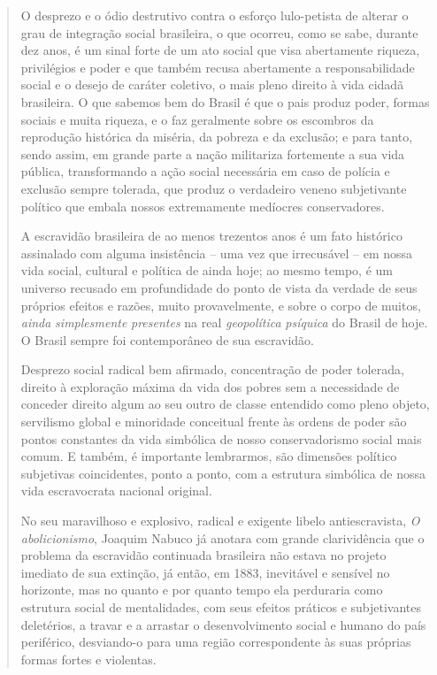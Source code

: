 \begin{quote}
O desprezo e o ódio destrutivo contra o esforço lulo-petista de alterar
o grau de integração social brasileira, o que ocorreu, como se sabe,
durante dez anos, é um sinal forte de um ato social que visa abertamente
riqueza, privilégios e poder e que também recusa abertamente a
responsabilidade social e o desejo de caráter coletivo, o mais pleno
direito à vida cidadã brasileira. O que sabemos bem do Brasil é que o
pais produz poder, formas sociais e muita riqueza, e o faz geralmente
sobre os escombros da reprodução histórica da miséria, da pobreza e da
exclusão; e para tanto, sendo assim, em grande parte a nação militariza
fortemente a sua vida pública, transformando a ação social necessária em
caso de polícia e exclusão sempre tolerada, que produz o verdadeiro
veneno subjetivante político que embala nossos extremamente medíocres
conservadores.

A escravidão brasileira de ao menos trezentos anos é um fato histórico
assinalado com alguma insistência -- uma vez que irrecusável -- em nossa
vida social, cultural e política de ainda hoje; ao mesmo tempo, é um
universo recusado em profundidade do ponto de vista da verdade de seus
próprios efeitos e razões, muito provavelmente, e sobre o corpo de
muitos, \emph{ainda} \emph{simplesmente} \emph{presentes} na real
\emph{geopolítica} \emph{psíquica} do Brasil de hoje. O Brasil sempre
foi contemporâneo de sua escravidão.

Desprezo social radical bem afirmado, concentração de poder tolerada,
direito à exploração máxima da vida dos pobres sem a necessidade de
conceder direito algum ao seu outro de classe entendido como pleno
objeto, servilismo global e minoridade conceitual frente às ordens de
poder são pontos constantes da vida simbólica de nosso conservadorismo
social mais comum. E também, é importante lembrarmos, são dimensões
político subjetivas coincidentes, ponto a ponto, com a estrutura
simbólica de nossa vida escravocrata nacional original.

No seu maravilhoso e explosivo, radical e exigente libelo
antiescravista, \emph{O abolicionismo}, Joaquim Nabuco já anotara com
grande clarividência que o problema da escravidão continuada brasileira
não estava no projeto imediato de sua extinção, já então, em 1883,
inevitável e sensível no horizonte, mas no quanto e por quanto tempo ela
perduraria como estrutura social de mentalidades, com seus efeitos
práticos e subjetivantes deletérios, a travar e a arrastar o
desenvolvimento social e humano do país periférico, desviando-o para uma
região correspondente às suas próprias formas fortes e violentas.


\end{quote}
